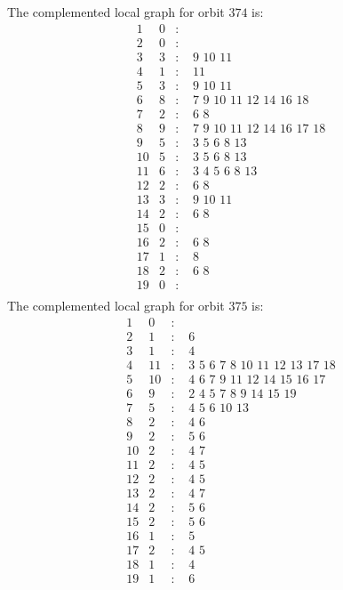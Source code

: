 \documentclass[12pt]{article}
\begin{document}
The complemented local graph for orbit $374$ is:
\begin{equation*}
\begin{array}{rrcl}
1&0&:&\\
2&0&:&\\
3&3&:&\,\,9\,\,10\,\,11\\
4&1&:&\,\,11\\
5&3&:&\,\,9\,\,10\,\,11\\
6&8&:&\,\,7\,\,9\,\,10\,\,11\,\,12\,\,14\,\,16\,\,18\\
7&2&:&\,\,6\,\,8\\
8&9&:&\,\,7\,\,9\,\,10\,\,11\,\,12\,\,14\,\,16\,\,17\,\,18\\
9&5&:&\,\,3\,\,5\,\,6\,\,8\,\,13\\
10&5&:&\,\,3\,\,5\,\,6\,\,8\,\,13\\
11&6&:&\,\,3\,\,4\,\,5\,\,6\,\,8\,\,13\\
12&2&:&\,\,6\,\,8\\
13&3&:&\,\,9\,\,10\,\,11\\
14&2&:&\,\,6\,\,8\\
15&0&:&\\
16&2&:&\,\,6\,\,8\\
17&1&:&\,\,8\\
18&2&:&\,\,6\,\,8\\
19&0&:&\\
\end{array}
\end{equation*}
The complemented local graph for orbit $375$ is:
\begin{equation*}
\begin{array}{rrcl}
1&0&:&\\
2&1&:&\,\,6\\
3&1&:&\,\,4\\
4&11&:&\,\,3\,\,5\,\,6\,\,7\,\,8\,\,10\,\,11\,\,12\,\,13\,\,17\,\,18\\
5&10&:&\,\,4\,\,6\,\,7\,\,9\,\,11\,\,12\,\,14\,\,15\,\,16\,\,17\\
6&9&:&\,\,2\,\,4\,\,5\,\,7\,\,8\,\,9\,\,14\,\,15\,\,19\\
7&5&:&\,\,4\,\,5\,\,6\,\,10\,\,13\\
8&2&:&\,\,4\,\,6\\
9&2&:&\,\,5\,\,6\\
10&2&:&\,\,4\,\,7\\
11&2&:&\,\,4\,\,5\\
12&2&:&\,\,4\,\,5\\
13&2&:&\,\,4\,\,7\\
14&2&:&\,\,5\,\,6\\
15&2&:&\,\,5\,\,6\\
16&1&:&\,\,5\\
17&2&:&\,\,4\,\,5\\
18&1&:&\,\,4\\
19&1&:&\,\,6\\
\end{array}
\end{equation*}
\end{document}
